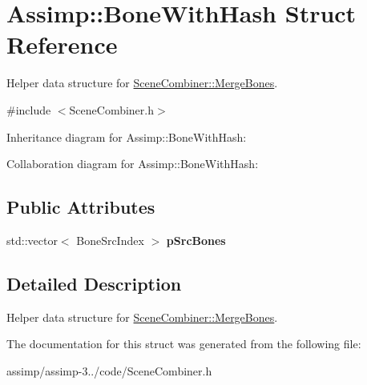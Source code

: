 \hypertarget{struct_assimp_1_1_bone_with_hash}{\section{Assimp\+:\+:Bone\+With\+Hash Struct Reference}
\label{struct_assimp_1_1_bone_with_hash}
}


Helper data structure for \hyperlink{class_assimp_1_1_scene_combiner_a4edb3acefc33160d667f47c045ef6ba8}{Scene\+Combiner\+::\+Merge\+Bones}.  




{\ttfamily \#include $<$Scene\+Combiner.\+h$>$}



Inheritance diagram for Assimp\+:\+:Bone\+With\+Hash\+:


Collaboration diagram for Assimp\+:\+:Bone\+With\+Hash\+:
\subsection*{Public Attributes}
\begin{DoxyCompactItemize}
\item 
\hypertarget{struct_assimp_1_1_bone_with_hash_afd0ae0a14a4ba9e747425fabc56b8024}{std\+::vector$<$ Bone\+Src\+Index $>$ {\bfseries p\+Src\+Bones}}\label{struct_assimp_1_1_bone_with_hash_afd0ae0a14a4ba9e747425fabc56b8024}

\end{DoxyCompactItemize}


\subsection{Detailed Description}
Helper data structure for \hyperlink{class_assimp_1_1_scene_combiner_a4edb3acefc33160d667f47c045ef6ba8}{Scene\+Combiner\+::\+Merge\+Bones}. 

The documentation for this struct was generated from the following file\+:\begin{DoxyCompactItemize}
\item 
assimp/assimp-\/3../code/Scene\+Combiner.\+h\end{DoxyCompactItemize}
